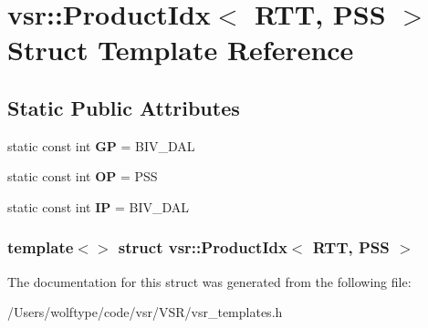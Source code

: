 \hypertarget{structvsr_1_1_product_idx_3_01_r_t_t_00_01_p_s_s_01_4}{\section{vsr\-:\-:Product\-Idx$<$ R\-T\-T, P\-S\-S $>$ Struct Template Reference}
\label{structvsr_1_1_product_idx_3_01_r_t_t_00_01_p_s_s_01_4}
}
\subsection*{Static Public Attributes}
\begin{DoxyCompactItemize}
\item 
\hypertarget{structvsr_1_1_product_idx_3_01_r_t_t_00_01_p_s_s_01_4_a0eab9817ae1d73c47d42724185b2cfec}{static const int {\bfseries G\-P} = B\-I\-V\-\_\-\-D\-A\-L}\label{structvsr_1_1_product_idx_3_01_r_t_t_00_01_p_s_s_01_4_a0eab9817ae1d73c47d42724185b2cfec}

\item 
\hypertarget{structvsr_1_1_product_idx_3_01_r_t_t_00_01_p_s_s_01_4_a34666c4b0a0a11aca24c65b0d13f6e0f}{static const int {\bfseries O\-P} = P\-S\-S}\label{structvsr_1_1_product_idx_3_01_r_t_t_00_01_p_s_s_01_4_a34666c4b0a0a11aca24c65b0d13f6e0f}

\item 
\hypertarget{structvsr_1_1_product_idx_3_01_r_t_t_00_01_p_s_s_01_4_acbef60671d2e9e23222f547c60ffee62}{static const int {\bfseries I\-P} = B\-I\-V\-\_\-\-D\-A\-L}\label{structvsr_1_1_product_idx_3_01_r_t_t_00_01_p_s_s_01_4_acbef60671d2e9e23222f547c60ffee62}

\end{DoxyCompactItemize}
\subsubsection*{template$<$$>$ struct vsr\-::\-Product\-Idx$<$ R\-T\-T, P\-S\-S $>$}



The documentation for this struct was generated from the following file\-:\begin{DoxyCompactItemize}
\item 
/\-Users/wolftype/code/vsr/\-V\-S\-R/vsr\-\_\-templates.\-h\end{DoxyCompactItemize}

